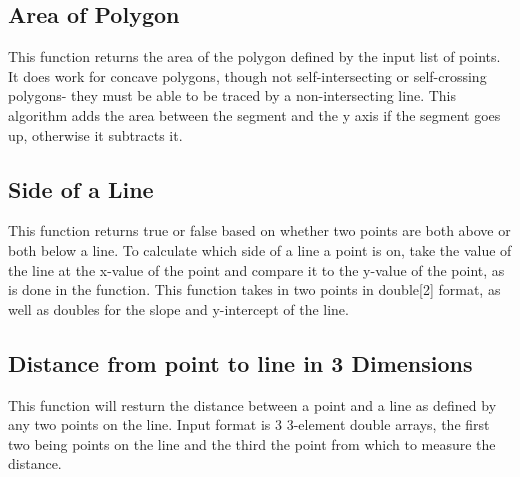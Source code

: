 \subsection{Area of Polygon}
This function returns the area of the polygon defined by the input list of points. It does work for concave polygons, though not self-intersecting or self-crossing polygons- they must be able to be traced by a non-intersecting line. This algorithm adds the area between the segment and the y axis if the segment goes up, otherwise it subtracts it.


\subsection{Side of a Line}
This function returns true or false based on whether two points are both above or both below a line. To calculate which side of a line a point is on, take the value of the line at the x-value of the point and compare it to the y-value of the point, as is done in the function. This function takes in two points in double[2] format, as well as doubles for the slope and y-intercept of the line.


\subsection{Distance from point to line in 3 Dimensions}
This function will resturn the distance between a point and a line as defined by any two points on the line. Input format is 3 3-element double arrays, the first two being points on the line and the third the point from which to measure the distance.

